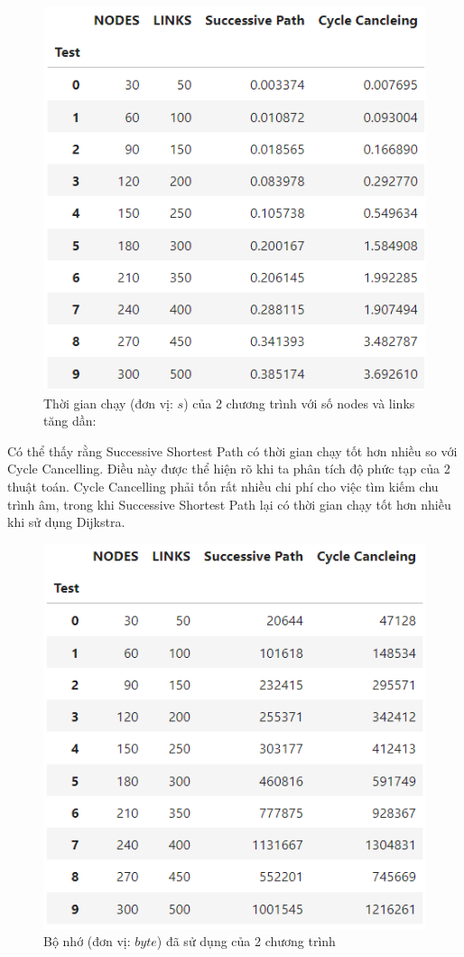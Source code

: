 \documentclass[a4paper]{article}
\begin{document}
\begin{figure}[h]
    \centering
    \includegraphics[scale=0.9]{runtime_normal.png}
    \caption{Thời gian chạy (đơn vị: $s$) của 2 chương trình với số nodes và links tăng dần:}
    \label{fig:enter-label}
\end{figure}
\newpage
{Có thể thấy rằng Successive Shortest Path có thời gian chạy tốt hơn nhiều so với Cycle Cancelling. Điều này được thể hiện rõ khi ta phân tích độ phức tạp của 2 thuật toán. Cycle Cancelling phải tốn rất nhiều chi phí cho việc tìm kiếm chu trình âm, trong khi Successive Shortest Path lại có thời gian chạy tốt hơn nhiều khi sử dụng Dijkstra. }

\begin{figure}[h]
    \centering
    \includegraphics{memory_normal.png}
    \caption{Bộ nhớ (đơn vị: $byte$) đã sử dụng của 2 chương trình}
    \label{fig:enter-label}
\end{figure}
\end{document}
